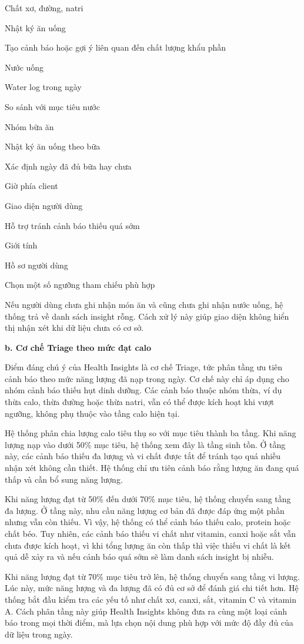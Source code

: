 Chất xơ, đường, natri

Nhật ký ăn uống

Tạo cảnh báo hoặc gợi ý liên quan đến chất lượng khẩu phần

Nước uống

Water log trong ngày

So sánh với mục tiêu nước

Nhóm bữa ăn

Nhật ký ăn uống theo bữa

Xác định ngày đã đủ bữa hay chưa

Giờ phía client

Giao diện người dùng

Hỗ trợ tránh cảnh báo thiếu quá sớm

Giới tính

Hồ sơ người dùng

Chọn một số ngưỡng tham chiếu phù hợp

Nếu người dùng chưa ghi nhận món ăn và cũng chưa ghi nhận nước uống, hệ thống trả về danh sách insight rỗng. Cách xử lý này giúp giao diện không hiển thị nhận xét khi dữ liệu chưa có cơ sở.

\textbf{b. Cơ chế Triage theo mức đạt calo}

Điểm đáng chú ý của Health Insights là cơ chế Triage, tức phân tầng ưu tiên cảnh báo theo mức năng lượng đã nạp trong ngày. Cơ chế này chỉ áp dụng cho nhóm cảnh báo thiếu hụt dinh dưỡng. Các cảnh báo thuộc nhóm thừa, ví dụ thừa calo, thừa đường hoặc thừa natri, vẫn có thể được kích hoạt khi vượt ngưỡng, không phụ thuộc vào tầng calo hiện tại.

Hệ thống phân chia lượng calo tiêu thụ so với mục tiêu thành ba tầng. Khi năng lượng nạp vào dưới 50\% mục tiêu, hệ thống xem đây là tầng sinh tồn. Ở tầng này, các cảnh báo thiếu đa lượng và vi chất được tắt để tránh tạo quá nhiều nhận xét không cần thiết. Hệ thống chỉ ưu tiên cảnh báo rằng lượng ăn đang quá thấp và cần bổ sung năng lượng.

Khi năng lượng đạt từ 50\% đến dưới 70\% mục tiêu, hệ thống chuyển sang tầng đa lượng. Ở tầng này, nhu cầu năng lượng cơ bản đã được đáp ứng một phần nhưng vẫn còn thiếu. Vì vậy, hệ thống có thể cảnh báo thiếu calo, protein hoặc chất béo. Tuy nhiên, các cảnh báo thiếu vi chất như vitamin, canxi hoặc sắt vẫn chưa được kích hoạt, vì khi tổng lượng ăn còn thấp thì việc thiếu vi chất là kết quả dễ xảy ra và nếu cảnh báo quá sớm sẽ làm danh sách insight bị nhiễu.

Khi năng lượng đạt từ 70\% mục tiêu trở lên, hệ thống chuyển sang tầng vi lượng. Lúc này, mức năng lượng và đa lượng đã có đủ cơ sở để đánh giá chi tiết hơn. Hệ thống bắt đầu kiểm tra các yếu tố như chất xơ, canxi, sắt, vitamin C và vitamin A. Cách phân tầng này giúp Health Insights không đưa ra cùng một loại cảnh báo trong mọi thời điểm, mà lựa chọn nội dung phù hợp với mức độ đầy đủ của dữ liệu trong ngày.

